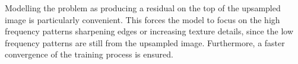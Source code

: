 Modelling the problem as producing a residual on the top of the upsampled image is particularly convenient. This forces the model to focus on the high frequency patterns sharpening edges or increasing texture details, since the low frequency patterns are still from the upsampled image. Furthermore, a faster convergence of the training process is ensured.
 





